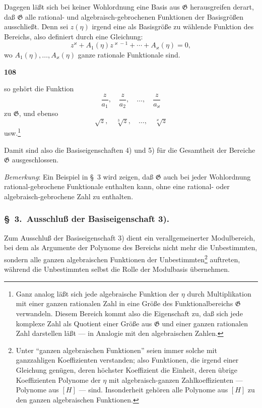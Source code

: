 \documentclass[12pt,a4paper]{article}
\begin{document}
Dagegen l\"a\ss t sich bei keiner Wohlordnung eine Basis aus $\mathfrak{G}$ herausgreifen derart, da\ss{} $\mathfrak{G}$ alle rational- und algebraisch-gebrochenen Funktionen der Basisgr\"o\ss en ausschlie\ss t. Denn sei $z(\eta)$ irgend eine als Basisgr\"o\ss e zu w\"ahlende Funktion des Bereichs, also definiert durch eine Gleichung:
\[z^{\varkappa} + A_1(\eta) z^{\varkappa-1} + \cdots + A_{\varkappa}(\eta) = 0,\]
wo $A_1(\eta), \ldots, A_{\varkappa}(\eta)$ ganze rationale Funktionale sind.

\newpage
\begin{center}
\textbf{108}
\end{center}

so geh\"ort die Funktion
\[\frac{z}{a_1}, \quad \frac{z}{a_2}, \quad \ldots, \quad \frac{z}{a_{\varkappa}}\]
zu $\mathfrak{G}$, und ebenso
\[\sqrt{z}, \quad \sqrt[3]{z}, \quad \ldots, \quad \sqrt[{\varkappa}]{z}\]
usw.\footnote{Ganz analog l\"a\ss t sich jede algebraische Funktion der $\eta$ durch Multiplikation mit einer ganzen rationalen Zahl in eine Gr\"o\ss e des Funktionalbereichs $\mathfrak{G}$ verwandeln. Diesem Bereich kommt also die Eigenschaft zu, da\ss{} sich jede komplexe Zahl als Quotient einer Gr\"o\ss e aus $\mathfrak{G}$ und einer ganzen rationalen Zahl darstellen l\"a\ss t --- in Analogie mit den algebraischen Zahlen.}

Damit sind also die Basiseigenschaften 4) und 5) f\"ur die Gesamtheit der Bereiche $\mathfrak{G}$ ausgeschlossen.

\emph{Bemerkung}: Ein Beispiel in \S\ 3 wird zeigen, da\ss{} $\mathfrak{G}$ auch bei jeder Wohlordnung rational-gebrochene Funktionale enthalten kann, ohne eine rational- oder algebraisch-gebrochene Zahl zu enthalten.

\subsubsection*{\S\ 3.\ Ausschlu\ss{} der Basiseigenschaft 3).}

Zum Ausschlu\ss{} der Basiseigenschaft 3) dient ein verallgemeinerter Modulbereich, bei dem als Argumente der Polynome des Bereichs nicht mehr die Unbestimmten, sondern alle ganzen algebraischen Funktionen der Unbestimmten\footnote{Unter ``ganzen algebraischen Funktionen'' seien immer solche mit ganzzahligen Koeffizienten verstanden; also Funktionen, die irgend einer Gleichung gen\"ugen, deren h\"ochster Koeffizient die Einheit, deren \"ubrige Koeffizienten Polynome der $\eta$ mit algebraisch-ganzen Zahlkoeffizienten --- Polynome aus $[H]$ --- sind. Insonderheit geh\"oren alle Polynome aus $[H]$ zu den ganzen algebraischen Funktionen.} auftreten, w\"ahrend die Unbestimmten selbst die Rolle der Modulbasis \"ubernehmen.
\end{document}
